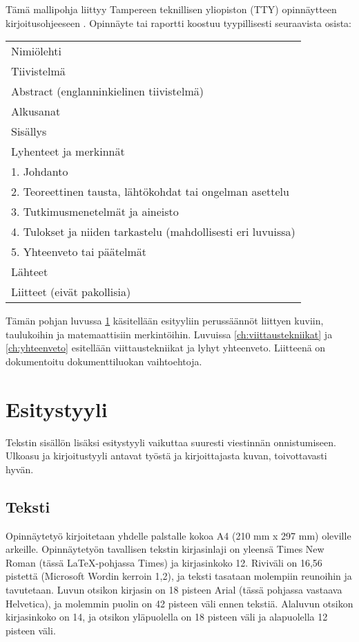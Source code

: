 \documentclass[globalnumbering,centeredcaptions,draftfooter]{tutthesis/tutthesis} %
\begin{document}
Tämä mallipohja liittyy Tampereen teknillisen yliopiston (TTY) opinnäytteen kirjoitusohjeeseen \citep{Tty2017}.
Opinnäyte tai raportti koostuu tyypillisesti seuraavista osista:

\begin{tabular}[h]{l}
Nimiölehti\\
Tiivistelmä\\
Abstract (englanninkielinen tiivistelmä)\\
Alkusanat\\
Sisällys\\
Lyhenteet ja merkinnät\\
1. Johdanto\\
2. Teoreettinen tausta, lähtökohdat tai ongelman asettelu \\
3. Tutkimusmenetelmät ja aineisto \\
4. Tulokset ja niiden tarkastelu (mahdollisesti eri luvuissa)\\
5. Yhteenveto tai päätelmät\\
Lähteet\\
Liitteet (eivät pakollisia)\\
\end{tabular}

Tämän pohjan luvussa \ref{ch:esitystyyli} käsitellään esityyliin perussäännöt liittyen kuviin, taulukoihin ja matemaattisiin merkintöihin.
Luvuissa \ref{ch:viittaustekniikat} ja \ref{ch:yhteenveto} esitellään viittaustekniikat ja lyhyt yhteenveto.
Liitteenä on dokumentoitu dokumenttiluokan vaihtoehtoja.



\chapter{Esitystyyli}
\label{ch:esitystyyli}

Tekstin sisällön lisäksi esitystyyli vaikuttaa suuresti viestinnän onnistumiseen.
Ulkoasu ja kirjoitustyyli antavat työstä ja kirjoittajasta kuvan, toivottavasti hyvän.

\section{Teksti}

Opinnäytetyö kirjoitetaan yhdelle palstalle kokoa A4 (210 mm x 297 mm) oleville arkeille.
Opinnäytetyön tavallisen tekstin kirjasinlaji on yleensä Times New Roman (tässä LaTeX-pohjassa Times) ja kirjasinkoko 12.
Riviväli on 16,56 pistettä (Microsoft Wordin kerroin 1,2), ja teksti tasataan molempiin reunoihin ja tavutetaan.
Luvun otsikon kirjasin on 18 pisteen Arial (tässä pohjassa vastaava Helvetica), ja molemmin puolin on 42 pisteen väli ennen tekstiä.
Alaluvun otsikon kirjasinkoko on 14, ja otsikon yläpuolella on 18 pisteen väli ja alapuolella 12 pisteen väli.
\end{document}
